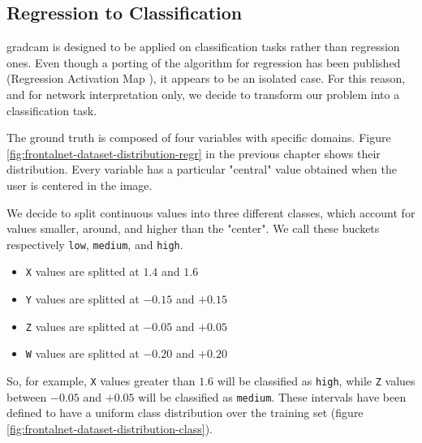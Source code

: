 \subsection{Regression to Classification}
\label{subsec:gradcam-regrtoclass}

\gls{gradcam} is designed to be applied on classification tasks rather than regression ones. Even though a porting of the algorithm for regression has been published (Regression Activation Map \cite{wang2019diabetic}), it appears to be an isolated case. For this reason, and for network interpretation only, we decide to transform our problem into a classification task.

The ground truth is composed of four variables with specific domains. Figure \ref{fig:frontalnet-dataset-distribution-regr} in the previous chapter shows their distribution. Every variable has a particular "central" value obtained when the user is centered in the image. 

We decide to split continuous values into three different classes, which account for values smaller, around, and higher than the "center". We call these buckets respectively \texttt{low}, \texttt{medium}, and \texttt{high}.

\begin{itemize}
	\item \texttt{X} values are splitted at $1.4$ and $1.6$
	\item \texttt{Y} values are splitted at $-0.15$ and $+0.15$
	\item \texttt{Z} values are splitted at $-0.05$ and $+0.05$
	\item \texttt{W} values are splitted at $-0.20$ and $+0.20$
\end{itemize}

So, for example, \texttt{X} values greater than $1.6$ will be classified as \texttt{high}, while \texttt{Z} values between $-0.05$ and $+0.05$ will be classified as \texttt{medium}. These intervals have been defined to have a uniform class distribution over the training set (figure \ref{fig:frontalnet-dataset-distribution-class}).

